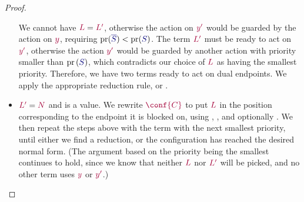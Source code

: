 \begin{proof}
\begin{itemize}
    We cannot have $\tm{L}=\tm{L'}$, otherwise the action on $\tm{y'}$ would be guarded by the action on $\tm{y}$, requiring $\pr(\ty{\co{S}})<\pr(\ty{S})$. The term $\tm{L'}$ must be ready to act on $\tm{y'}$, otherwise the action $\tm{y'}$ would be guarded by another action with priority smaller than $\pr{(\ty{S})}$, which contradicts our choice of $\tm{L}$ as having the smallest priority. Therefore, we have two terms ready to act on dual endpoints. We apply the appropriate reduction rule, \ie {} or .
  \item
    $\tm{L'}=\tm{N}$ and is a value. We rewrite $\tm{\conf{C}}$ to put $\tm{L}$ in the position corresponding to the endpoint it is blocked on, using , , and optionally . We then repeat the steps above with the term with the next smallest priority, until either we find a reduction, or the configuration has reached the desired normal form. (The argument based on the priority being the smallest continues to hold, since we know that neither $\tm{L}$ nor $\tm{L'}$ will be picked, and no other term uses $\tm{y}$ or $\tm{y'}$.)
  \end{itemize} 
\end{proof}

